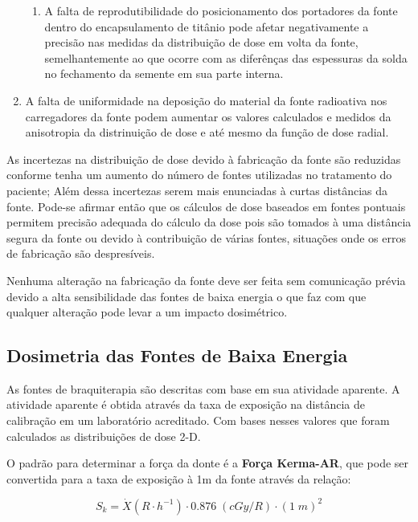 \documentclass[11pt,a4paper]{article}
\begin{document}
\begin{enumerate}
\begin{enumerate}
							\item A falta de reprodutibilidade do posicionamento dos portadores da fonte dentro do encapsulamento de titânio pode afetar negativamente a precisão nas medidas da distribuição de dose em volta da fonte, semelhantemente ao que ocorre com as diferênças das espessuras da solda no fechamento da semente em sua parte interna.
							
						\end{enumerate}
					
					\item A falta de uniformidade na deposição do material da fonte radioativa nos carregadores da fonte podem aumentar os valores calculados e medidos da anisotropia da distrinuição de dose e até mesmo da função de dose radial.
					
				\end{enumerate}

			As incertezas na distribuição de dose devido à fabricação da fonte são reduzidas conforme tenha um aumento do número de fontes utilizadas no tratamento do paciente; Além dessa incertezas serem mais enunciadas à curtas distâncias da fonte. Pode-se afirmar então que os cálculos de dose baseados em fontes pontuais permitem precisão adequada do cálculo da dose pois são tomados à uma distância segura da fonte ou devido à contribuição de várias fontes, situações onde os erros de fabricação são despresíveis.

			Nenhuma alteração na fabricação da fonte deve ser feita sem comunicação prévia devido a alta sensibilidade das fontes de baixa energia o que faz com que qualquer alteração pode levar a um impacto dosimétrico.

		\subsection{Dosimetria das Fontes de Baixa Energia}

			As fontes de braquiterapia são descritas com base em sua atividade aparente. A atividade aparente é obtida através da taxa de exposição na distância de calibração em um laboratório acreditado. Com bases nesses valores que foram calculados as distribuições de dose 2-D.

			O padrão para determinar a força da donte é a \textbf{\textcolor{CarnationPink}{Força Kerma-AR}}, que pode ser convertida para a taxa de exposição à 1m da fonte através da relação:

				\begin{equation}
					S_k = \dot{X}(R \cdot h^{-1}) \cdot 0.876 \; (cGy/R) \cdot (1 \; m)^2
				\end{equation}
			
\end{document}
